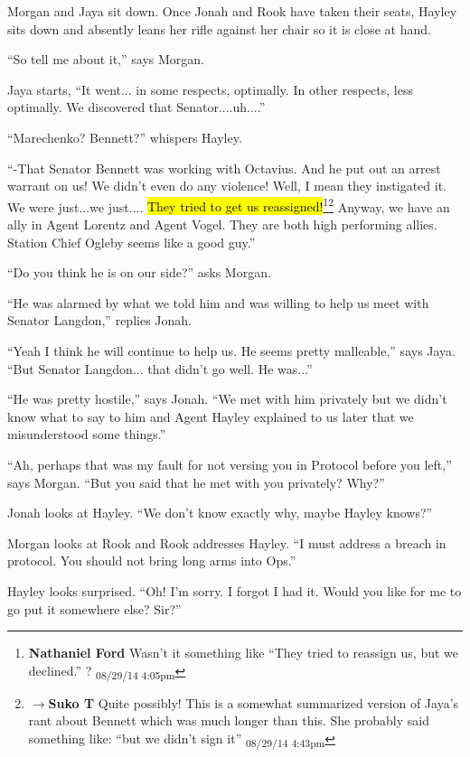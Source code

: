Morgan and Jaya sit down.  Once Jonah and Rook have taken their seats, Hayley sits down and absently leans her rifle against her chair so it is close at hand. 

``So tell me about it,'' says Morgan.

Jaya starts, ``It went... in some respects, optimally.  In other respects, less optimally.  We discovered that Senator....uh....''

``Marechenko?  Bennett?'' whispers Hayley.

``-That Senator Bennett was working with Octavius.  And he put out an arrest warrant on us!  We didn't even do any violence! Well, I mean they instigated it.  We were just...we just.... \hl{They tried to get us reassigned!}\footnote{\textbf{Nathaniel Ford }Wasn't it something like ``They tried to reassign us, but we declined.'' ? \textsubscript{08/29/14 4:05pm}}\footnote{$\rightarrow$\textbf{Suko T }Quite possibly!  This is a somewhat summarized version of Jaya's rant about Bennett which was much longer than this.  She probably said something like: ``but we didn't sign it'' \textsubscript{08/29/14 4:43pm}}  Anyway, we have an ally in Agent Lorentz and Agent Vogel. They are both high performing allies.  Station Chief Ogleby seems like a good guy.''

``Do you think he is on our side?'' asks Morgan.

``He was alarmed by what we told him and was willing to help us meet with Senator Langdon,'' replies Jonah.

``Yeah I think he will continue to help us. He seems pretty malleable,'' says Jaya.  ``But Senator Langdon... that didn't go well.  He was...''

``He was pretty hostile,'' says Jonah.  ``We met with him privately but we didn't know what to say to him and Agent Hayley explained to us later that we misunderstood some things.''

``Ah, perhaps that was my fault for not versing you in Protocol before you left,'' says Morgan.  ``But you said that he met with you privately?  Why?''

Jonah looks at Hayley.  ``We don't know exactly why, maybe Hayley knows?''

Morgan looks at Rook and Rook addresses Hayley. ``I must address a breach in protocol.  You should not bring long arms into Ops.''

Hayley looks surprised.  ``Oh!  I'm sorry.  I forgot I had it.  Would you like for me to go put it somewhere else?  Sir?''

